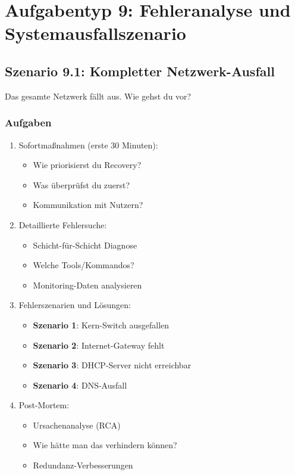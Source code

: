 \documentclass[12pt,a4paper,german]{report}
\begin{document}
\chapter{Aufgabentyp 9: Fehleranalyse und Systemausfallszenario}

\section{Szenario 9.1: Kompletter Netzwerk-Ausfall}

Das gesamte Netzwerk fällt aus. Wie gehst du vor?

\subsection{Aufgaben}
\begin{enumerate}
    \item Sofortmaßnahmen (erste 30 Minuten):
    \begin{itemize}
        \item Wie priorisierst du Recovery?
        \item Was überprüfst du zuerst?
        \item Kommunikation mit Nutzern?
    \end{itemize}
    \item Detaillierte Fehlersuche:
    \begin{itemize}
        \item Schicht-für-Schicht Diagnose
        \item Welche Tools/Kommandos?
        \item Monitoring-Daten analysieren
    \end{itemize}
    \item Fehlerszenarien und Lösungen:
    \begin{itemize}
        \item \textbf{Szenario 1}: Kern-Switch ausgefallen
        \item \textbf{Szenario 2}: Internet-Gateway fehlt
        \item \textbf{Szenario 3}: DHCP-Server nicht erreichbar
        \item \textbf{Szenario 4}: DNS-Ausfall
    \end{itemize}
    \item Post-Mortem:
    \begin{itemize}
        \item Ursachenanalyse (RCA)
        \item Wie hätte man das verhindern können?
        \item Redundanz-Verbesserungen
    \end{itemize}
\end{enumerate}
\end{document}
